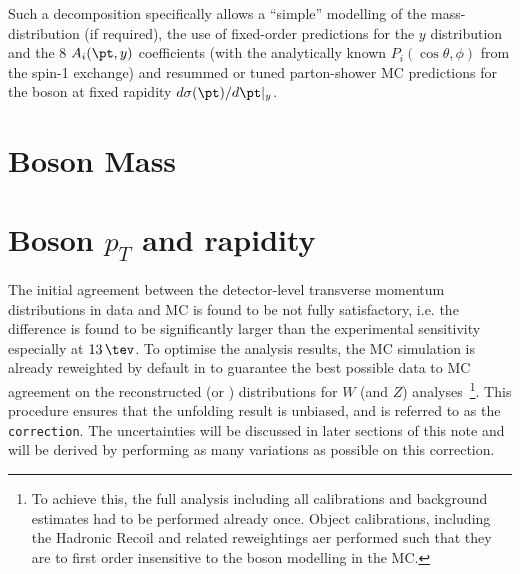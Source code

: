 Such a decomposition specifically allows a ``simple'' modelling of the
mass-distribution (if required), the use of fixed-order predictions
for the $y$ distribution and the 8 $A_i(\pt,y)$ coefficients (with the
analytically known $P_i(\cos\theta,\phi)$ from the spin-1 exchange)
and resummed or tuned parton-shower MC predictions for the boson \pT
at fixed rapidity $d\sigma(\pt)/d\pt|_y$.

\section{Boson Mass}


\section{Boson $p_T$ and rapidity}


The initial agreement between the detector-level transverse momentum
distributions in data and MC is found to be not fully satisfactory,
i.e. the difference is found to be significantly larger than the
experimental sensitivity especially at $13\,\tev$. 
To optimise the analysis results, the MC simulation is already
reweighted by default in \pttruthv to guarantee the best possible data
to MC agreement on the reconstructed \ut (or \ptll) distributions for
$W$ (and $Z$) analyses~\footnote{To achieve this, the full analysis
  including all calibrations and background estimates had to be
  performed already once. Object calibrations, including the Hadronic
  Recoil and related reweightings aer performed such that they are to
  first order insensitive to the boson \pt modelling in the MC.}. This
procedure ensures that the unfolding result is unbiased, and is
referred to as the \texttt{\pt correction}. The uncertainties will be
discussed in later sections of this note and will be derived by
performing as many variations as possible on this correction.


